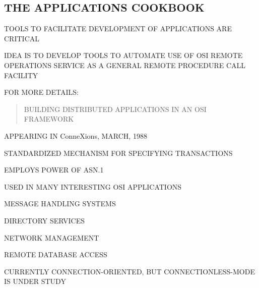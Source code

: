 \begin{bwslide}
\part*	{THE APPLICATIONS COOKBOOK}\bf

\begin{nrtc}
\item	TOOLS TO FACILITATE DEVELOPMENT OF APPLICATIONS ARE CRITICAL

\item	IDEA IS TO DEVELOP TOOLS TO AUTOMATE USE OF OSI REMOTE OPERATIONS
	SERVICE AS A GENERAL REMOTE PROCEDURE CALL FACILITY

\item	FOR MORE DETAILS:
\begin{quote}
BUILDING DISTRIBUTED APPLICATIONS IN AN OSI FRAMEWORK
\end{quote}
APPEARING IN ConneXions, MARCH, 1988
\end{nrtc}
\end{bwslide}


\begin{bwslide}

\begin{nrtc}
\item	STANDARDIZED MECHANISM FOR SPECIFYING TRANSACTIONS

\item	EMPLOYS POWER OF ASN.1

\item	USED IN MANY INTERESTING OSI APPLICATIONS
    \begin{nrtc}
    \item	MESSAGE HANDLING SYSTEMS

    \item	DIRECTORY SERVICES

    \item	NETWORK MANAGEMENT

    \item	REMOTE DATABASE ACCESS
    \end{nrtc}

\item	CURRENTLY CONNECTION-ORIENTED, BUT CONNECTIONLESS-MODE IS UNDER STUDY
\end{nrtc}
\end{bwslide}


